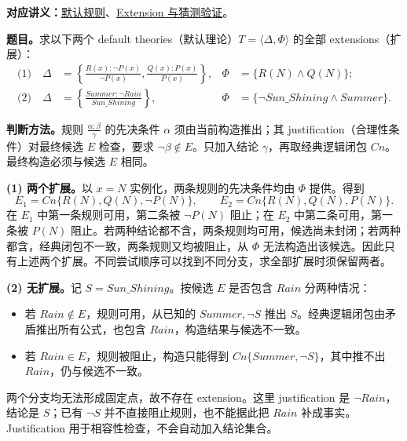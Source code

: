 \begingroup
\renewcommand{\recordid}[1]{}
\renewcommand{\relatedtopic}[2]{\hyperref[topic:#1]{#2}}
\label{tutorial:SC3000-TUT06}


\linespread{1.1}\selectfont
\setlength{\parskip}{0.35em}

\textbf{对应讲义：}\relatedtopic{SC3000-L10-T01}{默认规则}、\relatedtopic{SC3000-L10-T02}{Extension 与猜测验证}。

\textbf{题目。}求以下两个 default theories（默认理论）$T=\langle\Delta,\Phi\rangle$ 的全部 extensions（扩展）：
\begin{align*}
\text{(1)}\quad
\Delta&=\left\{\frac{R(x):\neg P(x)}{\neg P(x)},\frac{Q(x):P(x)}{P(x)}\right\},
&\Phi&=\{R(N)\land Q(N)\};\\
\text{(2)}\quad
\Delta&=\left\{\frac{Summer:\neg Rain}{Sun\_Shining}\right\},
&\Phi&=\{\neg Sun\_Shining\land Summer\}.
\end{align*}

\begin{checkedsolution}
\textbf{判断方法。}规则 $\frac{\alpha:\beta}{\gamma}$ 的先决条件 $\alpha$ 须由当前构造推出；其 justification（合理性条件）对最终候选 $E$ 检查，要求 $\neg\beta\notin E$。只加入结论 $\gamma$，再取经典逻辑闭包 $Cn$。最终构造必须与候选 $E$ 相同。

\textbf{(1) 两个扩展。}以 $x=N$ 实例化，两条规则的先决条件均由 $\Phi$ 提供。得到
\[
 E_1=Cn\{R(N),Q(N),\neg P(N)\},\qquad
 E_2=Cn\{R(N),Q(N),P(N)\}.
\]
在 $E_1$ 中第一条规则可用，第二条被 $\neg P(N)$ 阻止；在 $E_2$ 中第二条可用，第一条被 $P(N)$ 阻止。若两种结论都不含，两条规则均可用，候选尚未封闭；若两种都含，经典闭包不一致，两条规则又均被阻止，从 $\Phi$ 无法构造出该候选。因此只有上述两个扩展。不同尝试顺序可以找到不同分支，求全部扩展时须保留两者。

\textbf{(2) 无扩展。}记 $S=Sun\_Shining$。按候选 $E$ 是否包含 $Rain$ 分两种情况：
\begin{itemize}
 \item 若 $Rain\notin E$，规则可用，从已知的 $Summer,\neg S$ 推出 $S$。经典逻辑闭包由矛盾推出所有公式，也包含 $Rain$，构造结果与候选不一致。
 \item 若 $Rain\in E$，规则被阻止，构造只能得到 $Cn\{Summer,\neg S\}$，其中推不出 $Rain$，仍与候选不一致。
\end{itemize}
两个分支均无法形成固定点，故不存在 extension。这里 justification 是 $\neg Rain$，结论是 $S$；已有 $\neg S$ 并不直接阻止规则，也不能据此把 $Rain$ 补成事实。Justification 用于相容性检查，不会自动加入结论集合。
\end{checkedsolution}

